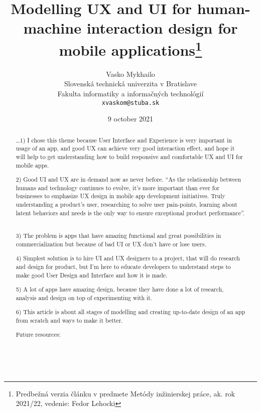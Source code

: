 \documentclass[10pt,twoside,slovak,a4paper]{article}
\title{Modelling UX and UI for human-machine interaction design for mobile applications\thanks{Predbežná verzia článku v predmete Metódy inžinierskej práce, ak. rok 2021/22, vedenie: Fedor Lehocki}} %
\author{Vasko Mykhailo\\[2pt]
	{\small Slovenská technická univerzita v Bratislave}\\
	{\small Fakulta informatiky a informačných technológií}\\
	{\small \texttt{xvaskom@stuba.sk}}
	}
\date{\small 9 october 2021} %
\begin{document}
\maketitle

\begin{abstract}
\ldots 1)	I chose this theme because User Interface and Experience is very important in usage of an app, and good UX can achieve very good interaction effect, and hope it will help to get understanding how to build responsive and comfortable UX and UI for mobile apps.

2)	Good UI and UX are in demand now as never before. “As the relationship between humans and technology continues to evolve, it’s more important than ever for businesses to emphasize UX design in mobile app development initiatives. Truly understanding a product’s user, researching to solve user pain-points, learning about latent behaviors and needs is the only way to ensure exceptional product performance”. ~\cite{WinNT}

3)	The problem is apps that have amazing functional and great possibilities in commercialization but because of bad UI or UX don’t have or lose users. \cite{Examples}

4)	Simplest solution is to hire UI and UX designers to a project, that will do research and design for product, but I’m here to educate developers to understand steps to make good User Design and Interface and how it is made.

5)	 A lot of apps have amazing design, because they have done a lot of research, analysis and design on top of experimenting with it.

6)	This article is about all stages of modelling and creating up-to-date design of an app from scratch and ways to make it better. 

Future resources:

~\cite{XiangqianFu2010}
~\cite{Salihu2018}
~\cite{Gao2017}
~\cite{Agolli2017}
~\cite{Kuusinen2014}
~\cite{WaterfallUX}
\end{abstract}
\end{document}
